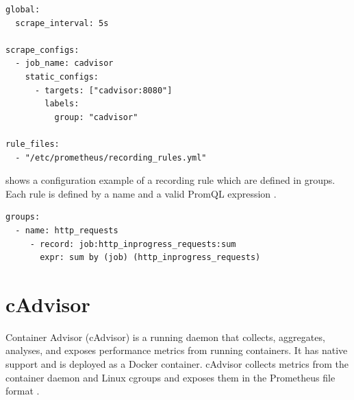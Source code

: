 \begin{lstlisting}[label=lst:04_prom_config_example, caption=Prometheus configuration file example]
global:
  scrape_interval: 5s

scrape_configs:
  - job_name: cadvisor
    static_configs:
      - targets: ["cadvisor:8080"]
        labels:
          group: "cadvisor"
          
rule_files:
  - "/etc/prometheus/recording_rules.yml"
\end{lstlisting}

 shows a configuration example of a recording rule which are defined in groups. 
Each rule is defined by a name and a valid PromQL expression \cite{Prom2020Docs}.

\begin{lstlisting}[label=lst:04_prom_config_rule-example, caption=Prometheus rules configuration file example]
groups:
  - name: http_requests
     - record: job:http_inprogress_requests:sum
       expr: sum by (job) (http_inprogress_requests)
\end{lstlisting}


\section{cAdvisor}
Container Advisor (cAdvisor) is a running daemon that collects, aggregates, analyses, and exposes performance metrics from running containers.
It has native support and is deployed as a Docker container.
cAdvisor collects metrics from the container daemon and Linux cgroups and exposes them in the Prometheus file format \cite{Bastos2019Prom, cadvisor2020Docs}.


